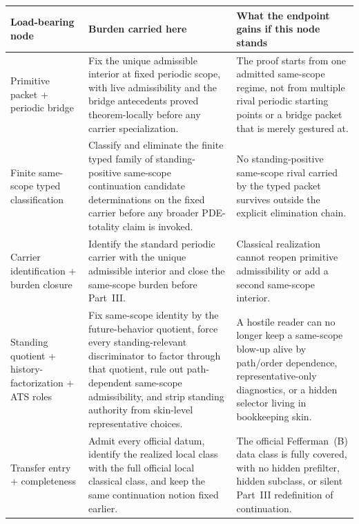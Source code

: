 \begin{tcolorbox}[title={Referee roadmap: load-bearing nodes, burdens, and endpoint gains}, colback=blue!2!white, colframe=blue!55!black, boxsep=1pt, left=2pt, right=2pt, top=2pt, bottom=2pt]
\footnotesize
\renewcommand{\arraystretch}{1.10}
\setlength{\tabcolsep}{3.5pt}
\begin{tabularx}{\textwidth}{@{}L{0.23\textwidth}L{0.35\textwidth}Y@{}}
\toprule
\textbf{Load-bearing node} & \textbf{Burden carried here} & \textbf{What the endpoint gains if this node stands}\\
\midrule
Primitive packet + periodic bridge & Fix the unique admissible interior at fixed periodic scope, with live admissibility and the bridge antecedents proved theorem-locally before any carrier specialization. & The proof starts from one admitted same-scope regime, not from multiple rival periodic starting points or a bridge packet that is merely gestured at.\\
Finite same-scope typed classification & Classify and eliminate the finite typed family of standing-positive same-scope continuation candidate determinations on the fixed carrier before any broader PDE-totality claim is invoked. & No standing-positive same-scope rival carried by the typed packet survives outside the explicit elimination chain.\\
Carrier identification + burden closure & Identify the standard periodic carrier with the unique admissible interior and close the same-scope burden before Part~III. & Classical realization cannot reopen primitive admissibility or add a second same-scope interior.\\
Standing quotient + history-factorization + ATS roles & Fix same-scope identity by the future-behavior quotient, force every standing-relevant discriminator to factor through that quotient, rule out path-dependent same-scope admissibility, and strip standing authority from skin-level representative choices. & A hostile reader can no longer keep a same-scope blow-up alive by path/order dependence, representative-only diagnostics, or a hidden selector living in bookkeeping skin.\\
Transfer entry + completeness & Admit every official datum, identify the realized local class with the full official local classical class, and keep the same continuation notion fixed earlier. & The official Fefferman~(B) data class is fully covered, with no hidden prefilter, hidden subclass, or silent Part~III redefinition of continuation.\\
\bottomrule
\end{tabularx}
\end{tcolorbox}

